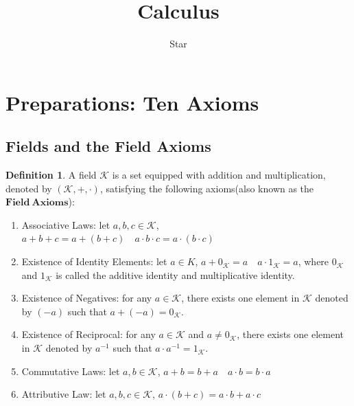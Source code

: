 \documentclass[a4paper]{ctexart}
\title{Calculus}
\author{Star}
\begin{document}
	\maketitle
	\newpage
	\tableofcontents
	\newpage
	\newcommand{\M}{\mathbf{M}}
    \newcommand{\R}{\mathbb{R}}
    \newcommand{\C}{\mathbb{C}}
    \newcommand{\Q}{\mathbb{Q}}
    \newcommand{\N}{\mathbb{N}}
    \newcommand{\Z}{\mathbb{Z}}
	\theoremstyle{definition}
	\renewcommand{\proofname}{Proof}
	\section{Preparations: Ten Axioms}
	\subsection{Fields and the Field Axioms}
	\newtheorem{mydef}{Definition}[subsection]
	\newtheorem{mypro}[mydef]{Proposition}
	\newtheorem{mythm}[mydef]{Theorem}
	\newtheorem{myrmk}[mydef]{Remark}
	\newtheorem{mynot}[mydef]{Notation}
	\newtheorem{myex}[mydef]{Example}
	\newtheorem{myax}[mydef]{Axiom}
	\newtheorem{mymthd}[mydef]{Method}
	\newtheorem{mylma}[mydef]{Lemma}
	\begin{mydef}
		A field $\mathcal{K}$ is a set equipped with addition and multiplication, denoted by $(\mathcal{K},+,\cdot)$, satisfying the following axioms(also known as the $\mathbf{Field\ Axioms}$):
		\begin{enumerate}
			\item Associative Laws: let $a,b,c \in \mathcal{K}$, $a+b+c=a+(b+c) \quad a\cdot b\cdot c=a\cdot (b\cdot c) $
			\item Existence of Identity Elements: let $a\in K$, $a+0_{\mathcal{K}}=a\quad a\cdot 1_{\mathcal{K}}=a$, where $0_{\mathcal{K}}$ and $1_\mathcal{K}$ is called the additive identity and multiplicative identity.
			\item Existence of Negatives: for any $a\in \mathcal{K}$, there exists one element in $\mathcal{K}$ denoted by $(-a)$ such that $a+(-a)=0_\mathcal{K}$.
			\item Existence of Reciprocal: for any $a\in \mathcal{K}$ and $a\neq 0_\mathcal{K}$, there exists one element in $\mathcal{K}$ denoted by $a^{-1}$ such that $a\cdot a^{-1} = 1_\mathcal{K}$. 
			\item Commutative Laws: let $ a,b\in \mathcal{K}$, $a+b=b+a \quad a\cdot b=b\cdot a$
			\item Attributive Law: let $a,b,c \in \mathcal{K}$, $a\cdot (b+c)=a\cdot b + a\cdot c$
		\end{enumerate}
	\end{mydef}	
\end{document}
